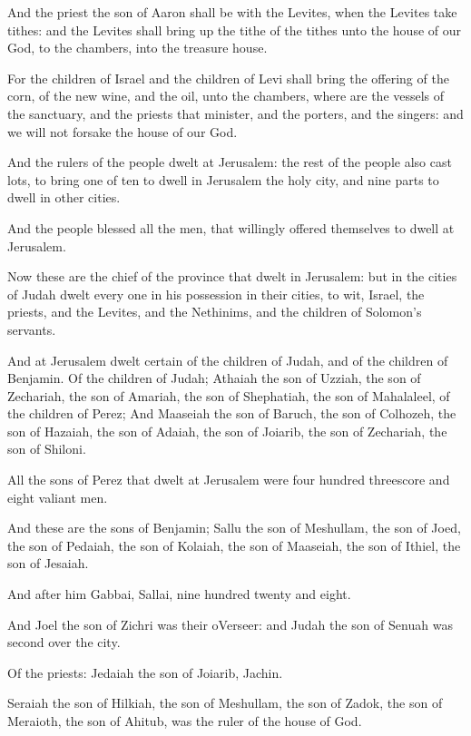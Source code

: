 \Verse And the priest the son of Aaron shall be with the Levites, when the Levites take tithes: and the Levites shall bring up the tithe of the tithes unto the house of our God, to the chambers, into the treasure house.

\Verse For the children of Israel and the children of Levi shall bring the offering of the corn, of the new wine, and the oil, unto the chambers, where are the vessels of the sanctuary, and the priests that minister, and the porters, and the singers: and we will not forsake the house of our God.


\Chapter
\Verse And the rulers of the people dwelt at Jerusalem: the rest of the people also cast lots, to bring one of ten to dwell in Jerusalem the holy city, and nine parts to dwell in other cities.

\Verse And the people blessed all the men, that willingly offered themselves to dwell at Jerusalem.

\Verse Now these are the chief of the province that dwelt in Jerusalem: but in the cities of Judah dwelt every one in his possession in their cities, to wit, Israel, the priests, and the Levites, and the Nethinims, and the children of Solomon's servants.

\Verse And at Jerusalem dwelt certain of the children of Judah, and of the children of Benjamin. Of the children of Judah; Athaiah the son of Uzziah, the son of Zechariah, the son of Amariah, the son of Shephatiah, the son of Mahalaleel, of the children of Perez; \Verse And Maaseiah the son of Baruch, the son of Colhozeh, the son of Hazaiah, the son of Adaiah, the son of Joiarib, the son of Zechariah, the son of Shiloni.

\Verse All the sons of Perez that dwelt at Jerusalem were four hundred threescore and eight valiant men.

\Verse And these are the sons of Benjamin; Sallu the son of Meshullam, the son of Joed, the son of Pedaiah, the son of Kolaiah, the son of Maaseiah, the son of Ithiel, the son of Jesaiah.

\Verse And after him Gabbai, Sallai, nine hundred twenty and eight.

\Verse And Joel the son of Zichri was their oVerseer: and Judah the son of Senuah was second over the city.

\Verse Of the priests: Jedaiah the son of Joiarib, Jachin.

\Verse Seraiah the son of Hilkiah, the son of Meshullam, the son of Zadok, the son of Meraioth, the son of Ahitub, was the ruler of the house of God.

